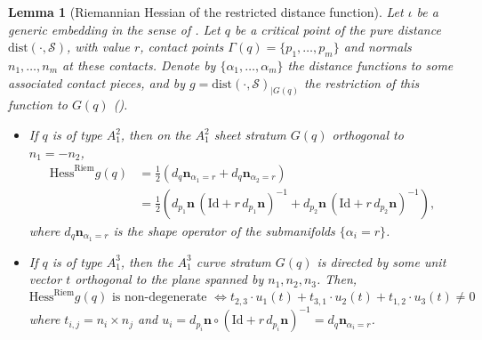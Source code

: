 \documentclass[11pt]{article}
\newcommand{\io}{\iota}
\newcommand{\nbf}{\mathbf{n}}
\newcommand{\dist}{\mathrm{dist}}
\newcommand{\Surf}{\mathcal{S}}
\newcommand{\Hess}{\mathrm{Hess}}
\newcommand{\Id}{\mathrm{Id}}
\theoremstyle{plain}
\newtheorem{lem}{Lemma}
\theoremstyle{definition}
\theoremstyle{remark}
\begin{document}
\begin{lem}[Riemannian Hessian of the restricted distance function]
	\label{lem:riem_hess}
	Let $\io$ be a generic embedding in the sense of . Let $q$ be a critical point of the pure distance $\dist(\cdot, \Surf)$, with value $r$, contact points $\Gamma(q) = \{p_1,\ldots,p_m\}$ and normals $n_1,\ldots,n_m$ at these contacts. Denote by $\{\alpha_1,\ldots,\alpha_m\}$ the distance functions to some associated contact pieces, and by $g = \dist(\cdot, \Surf)_{|G(q)}$ the restriction of this function to $G(q)$ ().
	\begin{itemize}
		\item If $q$ is of type $A_1^2$, then on the $A_1^2$ sheet stratum $G(q)$ orthogonal to $n_1 = - n_2$,
		\begin{align}
			\Hess^{\mathrm{Riem}} g(q) &= \frac{1}{2} (d_q \nbf_{\alpha_1 = r} + d_q \nbf_{\alpha_2 = r}) \\
			&= \frac{1}{2} \left( d_{p_1} \nbf \, (\Id + r \, d_{p_1} \nbf )^{-1} + d_{p_2} \nbf \, (\Id + r \, d_{p_2} \nbf )^{-1} \right),
		\end{align}
		where $d_q \nbf_{\alpha_1 = r}$ is the shape operator of the submanifolds $\{\alpha_i = r\}$.
		\item If $q$ is of type $A_1^3$, then the $A_1^3$ curve stratum $G(q)$ is directed by some unit vector $t$ orthogonal to the \textit{plane} spanned by $n_1,n_2,n_3$. Then,
		\begin{equation*}
			\Hess^{\mathrm{Riem}} g(q) \text{ is non-degenerate } \Leftrightarrow t_{2,3} \cdot u_1(t) + t_{3,1} \cdot u_2(t) + t_{1,2} \cdot u_3(t) \neq 0
		\end{equation*}
		where $t_{i,j} = n_i \times n_j$ and $u_i = d_{p_i} \nbf \circ (\Id + r \, d_{p_i} \nbf)^{-1} = d_q \nbf_{\alpha_i = r}$.
	\end{itemize}
\end{lem}
\end{document}
